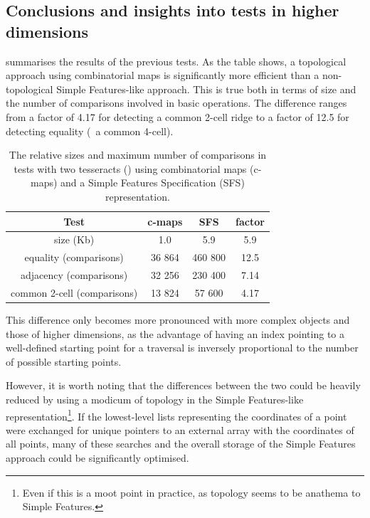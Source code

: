 \subsection*{Conclusions and insights into tests in higher dimensions}

 summarises the results of the previous tests.
As the table shows, a topological approach using combinatorial maps is significantly more efficient than a non-topological Simple Features-like approach.
This is true both in terms of size and the number of comparisons involved in basic operations.
The difference ranges from a factor of 4.17 for detecting a common 2-cell ridge to a factor of 12.5 for detecting equality (\ie\ a common 4-cell).

\begin{table}[tbp]
\caption[Tesseract comparison test results]{The relative sizes and maximum number of comparisons in tests with two tesseracts () using combinatorial maps (c-maps) and a Simple Features Specification (SFS) representation.}
\centering
\small
\begin{tabular}{cccc}
\toprule
Test & c-maps & SFS & factor \\
\midrule
size (Kb) & 1.0 & 5.9 & 5.9 \\
equality (comparisons) & 36 864 & 460 800 & 12.5 \\
adjacency (comparisons) & 32 256 & 230 400 & 7.14 \\
common 2-cell (comparisons) & 13 824 & 57 600 & 4.17 \\
\bottomrule
\end{tabular}
\label{table:comparison-tests}
\end{table}

This difference only becomes more pronounced with more complex objects and those of higher dimensions, as the advantage of having an index pointing to a well-defined starting point for a traversal is inversely proportional to the number of possible starting points.

However, it is worth noting that the differences between the two could be heavily reduced by using a modicum of topology in the Simple Features-like representation\footnote{Even if this is a moot point in practice, as topology seems to be anathema to Simple Features.}.
If the lowest-level lists representing the coordinates of a point were exchanged for unique pointers to an external array with the coordinates of all points, many of these searches and the overall storage of the Simple Features approach could be significantly optimised.